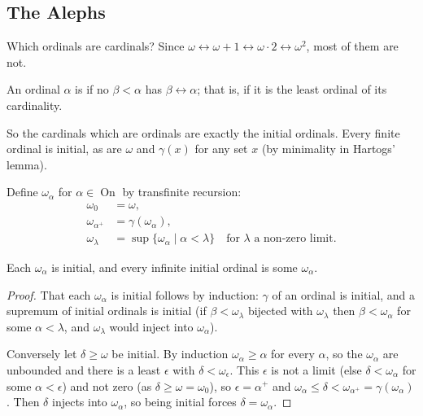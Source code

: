 \documentclass[a4paper]{scrartcl}
\newcommand{\on}{\operatorname{On}}
\begin{document}
\subsection{The Alephs}

Which ordinals are cardinals? Since $\omega \leftrightarrow \omega + 1 \leftrightarrow \omega \cdot 2 \leftrightarrow \omega^2$, most of them are not.

\begin{definition}
  An ordinal $\alpha$ is  if no $\beta < \alpha$ has $\beta \leftrightarrow \alpha$; that is, if it is the least ordinal of its cardinality.
\end{definition}

So the cardinals which are ordinals are exactly the initial ordinals. Every finite ordinal is initial, as are $\omega$ and $\gamma(x)$ for any set $x$ (by minimality in Hartogs' lemma).

\begin{definition}
  Define $\omega_\alpha$ for $\alpha \in \on$ by transfinite recursion:
  \begin{align*}
    \omega_0 &= \omega, \\
    \omega_{\alpha^+}&= \gamma(\omega_\alpha), \\
    \omega_{\lambda} &= \sup\{\omega_\alpha\mid \alpha < \lambda\} \quad \text{for } \lambda \text{ a non-zero limit.}
  \end{align*}
\end{definition}

\begin{proposition}
  Each $\omega_\alpha$ is initial, and every infinite initial ordinal is some $\omega_\alpha$.
\end{proposition}
\begin{proof}
  That each $\omega_\alpha$ is initial follows by induction: $\gamma$ of an ordinal is initial, and a supremum of initial ordinals is initial (if $\beta < \omega_\lambda$ bijected with $\omega_\lambda$ then $\beta < \omega_\alpha$ for some $\alpha < \lambda$, and $\omega_\lambda$ would inject into $\omega_\alpha$).

  Conversely let $\delta \geq \omega$ be initial. By induction $\omega_\alpha \geq \alpha$ for every $\alpha$, so the $\omega_\alpha$ are unbounded and there is a least $\epsilon$ with $\delta < \omega_\epsilon$. This $\epsilon$ is not a limit (else $\delta < \omega_\alpha$ for some $\alpha < \epsilon$) and not zero (as $\delta \geq \omega = \omega_0$), so $\epsilon = \alpha^+$ and $\omega_\alpha \leq \delta < \omega_{\alpha^+} = \gamma(\omega_\alpha)$. Then $\delta$ injects into $\omega_\alpha$, so being initial forces $\delta = \omega_\alpha$.
\end{proof}
\end{document}
